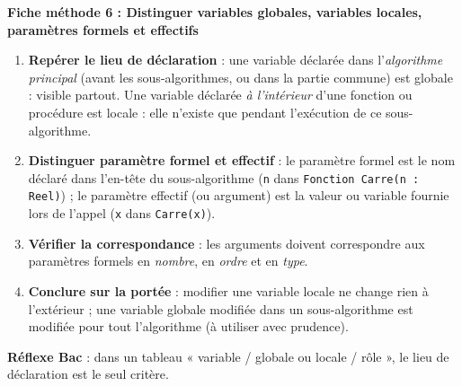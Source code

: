 \documentclass[11pt]{article}
\newcommand{\cle}[1]{{\popxbold\color{popdark}#1}}
\begin{document}
\textbf{Fiche méthode 6 : Distinguer variables globales, variables locales, paramètres formels et effectifs}\par
\begin{methode}
\begin{enumerate}
\item \textbf{Repérer le lieu de déclaration} : une variable déclarée dans l'\emph{algorithme principal} (avant les sous-algorithmes, ou dans la partie commune) est \cle{globale} : visible partout. Une variable déclarée \emph{à l'intérieur} d'une fonction ou procédure est \cle{locale} : elle n'existe que pendant l'exécution de ce sous-algorithme.
\item \textbf{Distinguer paramètre formel et effectif} : le \cle{paramètre formel} est le nom déclaré dans l'en-tête du sous-algorithme (\texttt{n} dans \texttt{Fonction Carre(n : Reel)}) ; le \cle{paramètre effectif} (ou argument) est la valeur ou variable fournie lors de l'appel (\texttt{x} dans \texttt{Carre(x)}).
\item \textbf{Vérifier la correspondance} : les arguments doivent correspondre aux paramètres formels en \emph{nombre}, en \emph{ordre} et en \emph{type}.
\item \textbf{Conclure sur la portée} : modifier une variable locale ne change rien à l'extérieur ; une variable globale modifiée dans un sous-algorithme est modifiée pour tout l'algorithme (à utiliser avec prudence).
\end{enumerate}
\textbf{Réflexe Bac} : dans un tableau « variable / globale ou locale / rôle », le lieu de déclaration est le seul critère.
\end{methode}
\end{document}
